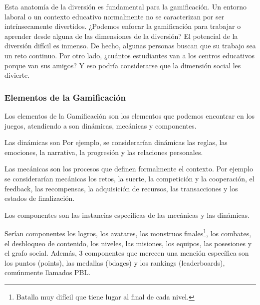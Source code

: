 Esta anatomía de la diversión es fundamental para la gamificación.
%
Un entorno laboral o un contexto educativo normalmente no se caracterizan por ser intrínsecamente divertidos.
%
¿Podemos enfocar la gamificación para trabajar o aprender desde alguna de las dimensiones de la diversión? 
%
El potencial de la diversión difícil es inmenso. 
%
De hecho, algunas personas buscan que su trabajo sea un reto continuo.
%
Por otro lado, ¿cuántos estudiantes van a los centros educativos porque van sus amigos?
%
Y eso podría considerarse que la dimensión social les divierte.



\subsubsection{Elementos de la Gamificación}
Los elementos de la Gamificación son los elementos que podemos encontrar en los juegos, atendiendo a \cite{Hunicke04mda:a} son dinámicas, mecánicas y componentes.

Las dinámicas son 
%
Por ejemplo, se considerarían dinámicas las reglas, las emociones, la narrativa, la progresión y las relaciones personales.

 Las mecánicas son los procesos que definen formalmente el contexto. 
%
Por ejemplo se considerarían mecánicas los retos, la suerte, la competición y la cooperación, el feedback, las recompensas, la adquisición de recursos, las transacciones y los estados de finalización.

 Los componentes son las instancias específicas de las mecánicas y las dinámicas. 

Serían componentes los logros, los avatares, los monstruos finales\footnote{Batalla muy difícil que tiene lugar al final de cada nivel.}, los combates, el desbloqueo de contenido, los niveles, las misiones, los equipos, las posesiones y el grafo social.
%
Además, 3 componentes que merecen una mención específica son los puntos (points), las medallas (bdages) y los rankings (leaderboards), comúnmente llamados \gls{PBL}.

